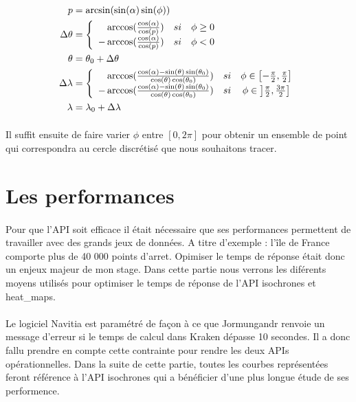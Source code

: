 \documentclass[a4paper]{report}
\begin{document}
\begin{align} 
	p&=\arcsin(\sin(\alpha)\sin(\phi)) \\
	\Delta \theta &= 
	\left \{
	\begin{array}{r c l}
		\arccos(\frac{\cos(\alpha)}{\cos(p)}) \quad si& \phi \ge 0 \\
		-\arccos(\frac{\cos(\alpha)}{\cos(p)}) \quad si& \phi < 0\\
	\end{array}
	\right. \\
	\theta &= \theta_{0} + \Delta \theta \\
	\Delta \lambda &= 
	\left \{
	\begin{array}{r c l}
		\arccos(\frac{\cos(\alpha) - \sin(\theta)\sin(\theta_0)}{\cos(\theta)\cos(\theta_0)}) \quad si& \phi \in \left[ -\frac{\pi}{2},\frac{\pi}{2} \right]\\
		-\arccos(\frac{\cos(\alpha) - \sin(\theta)\sin(\theta_0)}{\cos(\theta)\cos(\theta_0)}) \quad si& \phi \in \left] \frac{\pi}{2},\frac{3\pi}{2} \right]\\
	\end{array}
	\right. \\
	\lambda &= \lambda_{0} + \Delta \lambda 
\end{align}

\paragraph{} Il suffit ensuite de faire varier $\phi$ entre $\left[ 0, 2\pi \right]$ pour obtenir un ensemble de point qui correspondra au cercle discrétisé que nous souhaitons tracer.

\section{Les performances}

\paragraph{}Pour que l'API soit efficace il était nécessaire que ses performances permettent de travailler avec des grands jeux de données. A titre d'exemple : l'île de France comporte plus de 40 000 points d'arret. Opimiser le temps de réponse était donc un enjeux majeur de mon stage. Dans cette partie nous verrons les diférents moyens utilisés pour optimiser le temps de réponse de l'API isochrones et heat\_maps. 

\paragraph{}Le logiciel Navitia est paramétré de façon à ce que Jormungandr renvoie un message d'erreur si le temps de calcul dans Kraken dépasse 10 secondes. Il a donc fallu prendre en compte cette contrainte pour rendre les deux APIs opérationnelles. Dans la suite de cette partie, toutes les courbes représentées feront référence à l'API isochrones qui a bénéficier d'une plus longue étude de ses performence.
\end{document}
